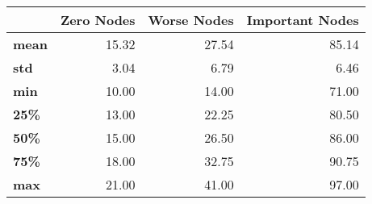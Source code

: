 \begin{tabular}{lrrr}
\toprule
{} &  Zero Nodes &  Worse Nodes &  Important Nodes \\
\midrule
\textbf{mean} &       15.32 &        27.54 &            85.14 \\
\textbf{std } &        3.04 &         6.79 &             6.46 \\
\textbf{min } &       10.00 &        14.00 &            71.00 \\
\textbf{25\% } &       13.00 &        22.25 &            80.50 \\
\textbf{50\% } &       15.00 &        26.50 &            86.00 \\
\textbf{75\% } &       18.00 &        32.75 &            90.75 \\
\textbf{max } &       21.00 &        41.00 &            97.00 \\
\bottomrule
\end{tabular}
